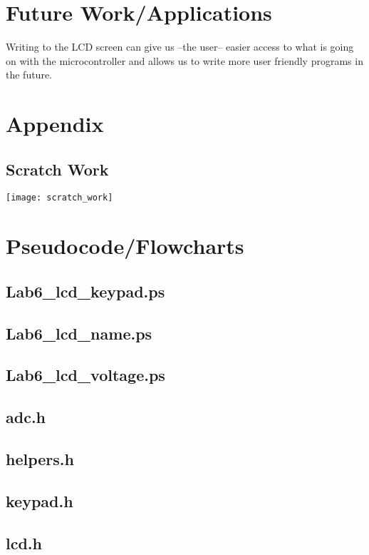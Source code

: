 \documentclass[letterpaper, 12pt]{article}
\begin{document}
\section*{Future Work/Applications}
Writing to the LCD screen can give us --the user-- easier access to what is going on with the microcontroller and allows us to write more user friendly programs in the future.
\section*{Appendix}
\subsection*{Scratch Work}
\begin{center}
  \texttt{[image: scratch\_work]}
\end{center}
\section*{Pseudocode/Flowcharts}
\subsection*{Lab6\_lcd\_keypad.ps}

\subsection*{Lab6\_lcd\_name.ps}

\subsection*{Lab6\_lcd\_voltage.ps}

\subsection*{adc.h}

\subsection*{helpers.h}

\subsection*{keypad.h}

\subsection*{lcd.h}

\end{document}
